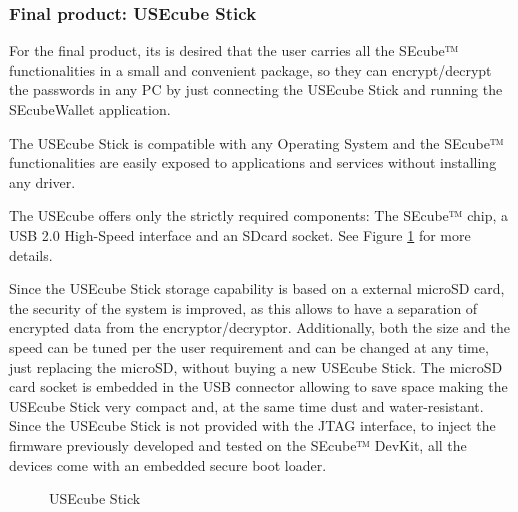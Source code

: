 \subsubsection{Final product: USEcube Stick}

For the final product, its is desired that the user carries all the SEcube™ functionalities in a small and convenient package, so they can encrypt/decrypt the passwords in any PC by just connecting the USEcube Stick and running the SEcubeWallet application.

The USEcube Stick is compatible with any Operating System and the SEcube™ functionalities are easily exposed to applications and services without installing any driver.

The USEcube offers only the strictly required components: The SEcube™ chip, a USB 2.0 High-Speed interface and an SDcard socket. See Figure \ref{fig:USEcube} for more details.


Since the USEcube Stick storage capability is based on a external microSD card, the security of the system is improved, as this allows to have a separation of encrypted data from the encryptor/decryptor. Additionally, both the size and the speed can be tuned per the user requirement and can be changed at any time, just replacing the microSD, without buying a new USEcube Stick.
The microSD card socket is embedded in the USB connector allowing to save space making the USEcube Stick very compact and, at the same time dust
and water-resistant.
Since the USEcube Stick is not provided with the JTAG interface, to inject the firmware previously developed and tested on the SEcube™ DevKit, all the devices come with an embedded secure boot loader.


\begin{figure}[ht]
  \centering
  \caption{USEcube Stick}
 \label{fig:USEcube}
\end{figure}


